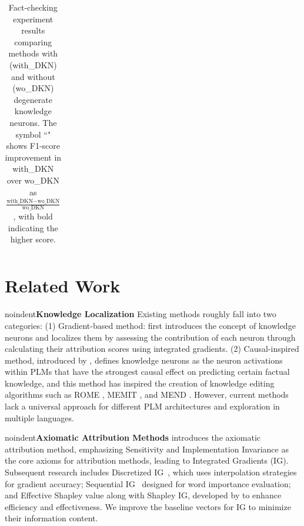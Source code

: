 \documentclass[]{article}
\newcommand{\vpara}[1]{noindent\textbf{#1 }}%
\begin{document}
\begin{table}
{\begin{tabular}{l|l|c|ccc}
\midrule
\end{tabular}
}
\caption{Fact-checking experiment results comparing methods with (with\_DKN) and without (wo\_DKN) degenerate knowledge neurons. The symbol ``\textuparrow" shows F1-score improvement in with\_DKN over wo\_DKN as $\frac{\text{with\_DKN} - \text{wo\_DKN}}{\text{wo\_DKN}}$, with bold indicating the higher score.}
\label{table:combined-experiments}
\end{table}


\section{Related Work}
\vpara{Knowledge Localization}
Existing methods roughly fall into two categories: (1) Gradient-based method: \citeauthor{dai2022kn} first introduces the concept of knowledge neurons and localizes them by assessing the contribution of each neuron \cite{key_value} through calculating their attribution scores using integrated gradients. (2) Causal-inspired method, introduced by \citeauthor{meng2022locating}, defines knowledge neurons as the neuron activations within PLMs that have the strongest causal effect on predicting certain factual knowledge, and this method has inspired the creation of knowledge editing algorithms such as ROME \cite{meng2022locating}, MEMIT \cite{meng2022memit}, and MEND \cite{mend}. However, current methods lack a universal approach for different PLM architectures and exploration in multiple languages.

\vpara{Axiomatic Attribution Methods}
\citeauthor{ig} introduces the axiomatic attribution method, emphasizing Sensitivity and Implementation Invariance as the core axioms for attribution methods, leading to Integrated Gradients (IG). Subsequent research includes Discretized IG~\cite{DIG}, which uses interpolation strategies for gradient accuracy; Sequential IG~\cite{enguehard2023sequential} designed for word importance evaluation; and Effective Shapley value along with Shapley IG, developed by \citeauthor{transparent} to enhance efficiency and effectiveness. We improve the baseline vectors for IG to minimize their information content.
\end{document}
